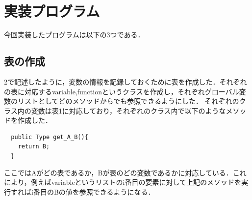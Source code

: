\documentclass[dvipdfmx]{jarticle}
\begin{document}
\section{実装プログラム}
今回実装したプログラムは以下の3つである．
\subsection{表の作成}
2で記述したように，変数の情報を記録しておくために表を作成した．それぞれの表に対応するvariable,functionというクラスを作成し，それぞれグローバル変数のリストとしてどのメソッドからでも参照できるようにした．
それぞれのクラス内の変数は表1に対応しており，それぞれのクラス内で以下のようなメソッドを作成した．
\begin{lstlisting}
  public Type get_A_B(){
    return B;
  }
\end{lstlisting}
ここではAがどの表であるか，Bが表のどの変数であるかに対応している．これにより，例えばvariableというリストのi番目の要素に対して上記のメソッドを実行すればi番目のBの値を参照できるようになる．
\end{document}
